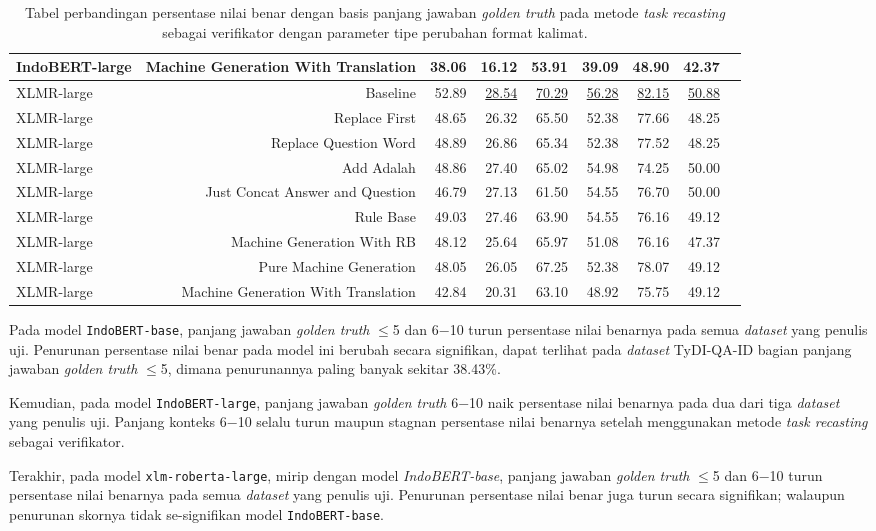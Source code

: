 \begin{table}[H]
\begin{tabular}{lrrrrrrrr}
IndoBERT-large &Machine Generation With Translation &38.06 &16.12 &53.91 &39.09 &48.90 &42.37 \\
\hline
XLMR-large &Baseline &52.89 &\underline{28.54} &\underline{70.29} &\underline{56.28} &\underline{82.15} &\underline{50.88} \\
XLMR-large &Replace First &48.65 &26.32 &65.50 &52.38 &77.66 &48.25 \\
XLMR-large &Replace Question Word &48.89 &26.86 &65.34 &52.38 &77.52 &48.25 \\
XLMR-large &Add Adalah &48.86 &27.40 &65.02 &54.98 &74.25 &50.00 \\
XLMR-large &Just Concat Answer and Question &46.79 &27.13 &61.50 &54.55 &76.70 &50.00 \\
XLMR-large &Rule Base &49.03 &27.46 &63.90 &54.55 &76.16 &49.12 \\
XLMR-large &Machine Generation With RB &48.12 &25.64 &65.97 &51.08 &76.16 &47.37 \\
XLMR-large &Pure Machine Generation &48.05 &26.05 &67.25 &52.38 &78.07 &49.12 \\
XLMR-large &Machine Generation With Translation &42.84 &20.31 &63.10 &48.92 &75.75 &49.12 \\
\bottomrule
\end{tabular}
\caption{Tabel perbandingan persentase nilai benar dengan basis panjang jawaban \emph{golden truth} pada metode \emph{task recasting} sebagai verifikator dengan parameter tipe perubahan format kalimat.}
\end{table}

Pada model \texttt{IndoBERT-base}, panjang jawaban \emph{golden truth} $\leq$5 dan 6$-$10 turun persentase nilai benarnya pada semua \emph{dataset} yang penulis uji. Penurunan persentase nilai benar pada model ini berubah secara signifikan, dapat terlihat pada \emph{dataset} TyDI-QA-ID bagian panjang jawaban \emph{golden truth} $\leq$5, dimana penurunannya paling banyak sekitar 38.43\%.

Kemudian, pada model \texttt{IndoBERT-large}, panjang jawaban \emph{golden truth} 6$-$10 naik persentase nilai benarnya pada dua dari tiga \emph{dataset} yang penulis uji. Panjang konteks  6$-$10 selalu turun maupun stagnan persentase nilai benarnya setelah menggunakan metode \emph{task recasting} sebagai verifikator.

Terakhir, pada model \texttt{xlm-roberta-large}, mirip dengan model \emph{IndoBERT-base}, panjang jawaban \emph{golden truth} $\leq$5 dan 6$-$10 turun persentase nilai benarnya pada semua \emph{dataset} yang penulis uji. Penurunan persentase nilai benar juga turun secara signifikan; walaupun penurunan skornya tidak se-signifikan model \texttt{IndoBERT-base}.

